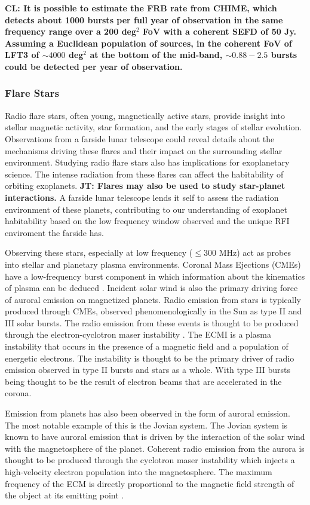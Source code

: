 \textbf{CL: It is possible to estimate the FRB rate from CHIME, which detects about 1000 bursts per full year of observation in the same frequency range over a 200 deg$^2$ FoV with a coherent SEFD of 50 Jy. Assuming a Euclidean population of sources, in the coherent FoV of LFT3 of $\sim 4000$ deg$^2$ at the bottom of the mid-band, $\sim 0.88-2.5$ bursts could be detected per year of observation.}

\subsubsection{Flare Stars}

Radio flare stars, often young, magnetically active stars, provide insight into stellar magnetic activity, star formation, and the early stages of stellar evolution. Observations from a farside lunar telescope could reveal details about the mechanisms driving these flares and their impact on the surrounding stellar environment. Studying radio flare stars also has implications for exoplanetary science. The intense radiation from these flares can affect the habitability of orbiting exoplanets. \textbf{JT: Flares may also be used to study star-planet interactions.} A farside lunar telescope lends it self to assess the radiation environment of these planets, contributing to our understanding of exoplanet habitability based on the low frequency window observed and the unique RFI enviroment the farside has.

Observing these stars, especially at low frequency ($\leq 300$ MHz) act as probes into stellar and planetary plasma environments. Coronal Mass Ejections (CMEs) have a low-frequency burst component in which information about the kinematics of plasma can be deduced \citep{villadsen_ultra-wideband_2019}. Incident solar wind is also the primary driving force of auroral emission on magnetized planets. Radio emission from stars is typically produced through CMEs, observed phenomenologically in the Sun as type II and III solar bursts. The radio emission from these events is thought to be produced through the electron-cyclotron maser instability \citep[ECMI;][]{EMI}. The ECMI is a plasma instability that occurs in the presence of a magnetic field and a population of energetic electrons. The instability is thought to be the primary driver of radio emission observed in type II bursts and stars as a whole. With type III bursts being thought to be the result of electron beams that are accelerated in the corona.

Emission from planets has also been observed in the form of auroral emission. The most notable example of this is the Jovian system. The Jovian system is known to have auroral emission that is driven by the interaction of the solar wind with the magnetosphere of the planet. Coherent radio emission from the aurora is thought to be produced through the cyclotron maser instability \citep[ECM;][]{zarka_auroral_1998} which injects a high-velocity electron population into the magnetosphere. The maximum frequency of the ECM is directly proportional to the magnetic field strength of the object at its emitting point \citep{kavanagh_hunting_2023, joe_nature_review}.

